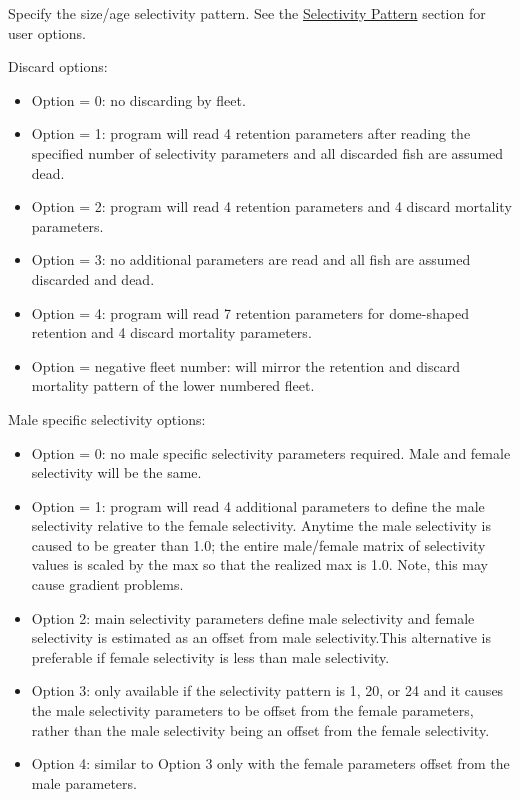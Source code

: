 Specify the size/age selectivity pattern. See the \hyperlink{SelexPattern}{Selectivity Pattern} section for user options.

\hypertarget{DomeRetention}{Discard options:}
\begin{itemize}
	\item Option = 0: no discarding by fleet.
	\item Option = 1: program will read 4 retention parameters after reading the specified number of selectivity parameters and all discarded fish are assumed dead.
	\item Option = 2: program will read 4 retention parameters and 4 discard mortality parameters.
	\item Option = 3: no additional parameters are read and all fish are assumed discarded and dead.
	\item Option = 4: program will read 7 retention parameters for dome-shaped retention and 4 discard mortality parameters.
	\item Option = negative fleet number: will mirror the retention and discard mortality pattern of the lower numbered fleet.
\end{itemize}

Male specific selectivity options:
\begin{itemize}
	\item Option = 0: no male specific selectivity parameters required. Male and female selectivity will be the same.
	\item Option = 1: program will read 4 additional parameters to define the male selectivity relative to the female selectivity. Anytime the male selectivity is caused to be greater than 1.0; the entire male/female matrix of selectivity values is scaled by the max so that the realized max is 1.0. Note, this may cause gradient problems.
	\item Option 2: main selectivity parameters define male selectivity and female selectivity is estimated as an offset from male selectivity.This alternative is preferable if female selectivity is less than male selectivity.
	\item Option 3: only available if the selectivity pattern is 1, 20, or 24 and it causes the male selectivity parameters to be offset from the female parameters, rather than the male selectivity being an offset from the female selectivity.
	\item Option 4: similar to Option 3 only with the female parameters offset from the male parameters.
\end{itemize}

